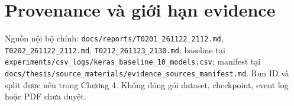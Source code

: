 \documentclass[12pt,a4paper,openany,oneside]{book}
\begin{document}
\frontmatter

\tableofcontents
\listoffigures
\listoftables
\mainmatter





\printbibliography[heading=bibintoc,title={Tài liệu tham khảo}]
\appendix
\chapter{Provenance và giới hạn evidence}
Nguồn nội bộ chính: \texttt{docs/reports/T0201\_261122\_2112.md}, \texttt{T0202\_261122\_2112.md}, \texttt{T0212\_261123\_2130.md}; baseline tại \texttt{experiments/csv\_logs/keras\_baseline\_10\_models.csv}; manifest tại \texttt{docs/thesis/source\_materials/evidence\_sources\_manifest.md}. Run ID và split được nêu trong Chương 4. Không đóng gói dataset, checkpoint, event log hoặc PDF chưa duyệt.
\end{document}
